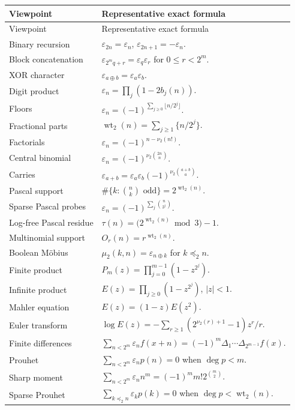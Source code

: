 \documentclass[11pt,oneside]{article}
\numberwithin{equation}{section}
\theoremstyle{definition}
\theoremstyle{remark}
\newcommand{\wt}{\operatorname{wt}_2}
\newcommand{\vtwo}{\nu_2}
\newcommand{\eps}{\varepsilon}
\newcommand{\xor}{\mathbin{\oplus}}
\newcommand{\submask}{\mathrel{\preccurlyeq_2}}
\begin{document}
\renewcommand{\arraystretch}{1.18}
\begin{longtable}{@{}p{}p{}@{}}
\toprule
Viewpoint & Representative exact formula \\
\midrule
\endfirsthead
\toprule
Viewpoint & Representative exact formula \\
\midrule
\endhead
Binary recursion & \(\eps_{2n}=\eps_n\), \(\eps_{2n+1}=-\eps_n\). \\
Block concatenation & \(\eps_{2^mq+r}=\eps_q\eps_r\) for \(0\le r<2^m\). \\
XOR character & \(\eps_{a\xor b}=\eps_a\eps_b\). \\
Digit product & \(\eps_n=\prod_j(1-2b_j(n))\). \\
Floors & \(\eps_n=(-1)^{\sum_{j\ge0}\lfloor n/2^j\rfloor}\). \\
Fractional parts & \(\wt(n)=\sum_{j\ge1}\{n/2^j\}\). \\
Factorials & \(\eps_n=(-1)^{n-\vtwo(n!)}\). \\
Central binomial & \(\eps_n=(-1)^{\vtwo\binom{2n}{n}}\). \\
Carries & \(\eps_{a+b}=\eps_a\eps_b(-1)^{\vtwo\binom{a+b}{a}}\). \\
Pascal support & \(\#\{k:\binom nk\text{ odd}\}=2^{\wt(n)}\). \\
Sparse Pascal probes & \(\eps_n=(-1)^{\sum_j\binom{n}{2^j}}\). \\
Log-free Pascal residue & \(\tau(n)=\bigl(2^{\wt(n)}\bmod3\bigr)-1\). \\
Multinomial support & \(O_r(n)=r^{\wt(n)}\). \\
Boolean M\"obius & \(\mu_2(k,n)=\eps_{n\xor k}\) for \(k\submask n\). \\
Finite product & \(P_m(z)=\prod_{j=0}^{m-1}(1-z^{2^j})\). \\
Infinite product & \(E(z)=\prod_{j\ge0}(1-z^{2^j})\), \(|z|<1\). \\
Mahler equation & \(E(z)=(1-z)E(z^2)\). \\
Euler transform & \(\log E(z)=-\sum_{r\ge1}(2^{\vtwo(r)+1}-1)z^r/r\). \\
Finite differences & \(\sum_{n<2^m}\eps_nf(x+n)=(-1)^m\Delta_1\cdots\Delta_{2^{m-1}}f(x)\). \\
Prouhet & \(\sum_{n<2^m}\eps_np(n)=0\) when \(\deg p<m\). \\
Sharp moment & \(\sum_{n<2^m}\eps_nn^m=(-1)^mm!2^{\binom m2}\). \\
Sparse Prouhet & \(\sum_{k\submask n}\eps_kp(k)=0\) when \(\deg p<\wt(n)\). \\

\end{longtable}
\end{document}
